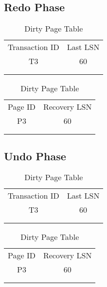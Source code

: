 \subsection{Redo Phase}
\begin{table}[H]
    \begin{minipage}{.5\linewidth}
      \centering
		\begin{tabular}{|c|c|}
		\cline{1-2}
		Transaction ID & Last LSN \\ \cline{1-2}
		T3             & 60       \\ \cline{1-2}
		               &          \\ \cline{1-2}
		               &          \\ \cline{1-2}
		\end{tabular}
      \caption{Transaction Table}

    \end{minipage}%
    \begin{minipage}{.5\linewidth}
      \centering
		\begin{tabular}{|c|c|}
		\cline{1-2}
		Page ID & Recovery LSN \\ \cline{1-2}
		P3      & 60           \\ \cline{1-2}
		        &              \\ \cline{1-2}
		        &              \\ \cline{1-2}
		\end{tabular}
        \caption{Dirty Page Table}

    \end{minipage} 
\end{table}

\subsection{Undo Phase}
\begin{table}[H]
    \begin{minipage}{.5\linewidth}
      \centering
		\begin{tabular}{|c|c|}
		\cline{1-2}
		Transaction ID & Last LSN \\ \cline{1-2}
		T3             & 60       \\ \cline{1-2}
		               &          \\ \cline{1-2}
		               &          \\ \cline{1-2}
		\end{tabular}
      \caption{Transaction Table}

    \end{minipage}%
    \begin{minipage}{.5\linewidth}
      \centering
		\begin{tabular}{|c|c|}
		\cline{1-2}
		Page ID & Recovery LSN \\ \cline{1-2}
		P3      & 60           \\ \cline{1-2}
		        &              \\ \cline{1-2}
		        &              \\ \cline{1-2}
		\end{tabular}
        \caption{Dirty Page Table}

    \end{minipage} 
\end{table}